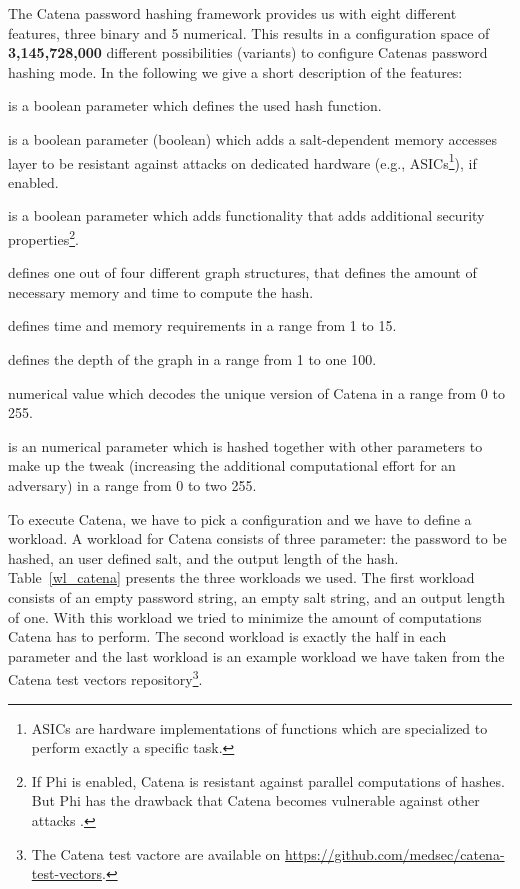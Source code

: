 The Catena password hashing framework provides us with eight different features, three binary and 5 numerical. This results in a configuration space of \textbf{3,145,728,000} different possibilities (variants) to configure Catenas password hashing mode. In the following we give a short description of the features:


\begin{description}[style=multiline,leftmargin=7em]
	\item [Hash] is a boolean parameter which defines the used hash function.
	\item [Gamma] is a boolean parameter (boolean) which adds a salt-dependent memory accesses layer to be resistant against attacks on dedicated hardware (e.g., ASICs\footnote{ASICs are hardware implementations of functions which are specialized to perform exactly a specific task.}), if enabled.
	\item [Phi] is a boolean parameter which adds functionality that adds additional security properties\footnote{If Phi is enabled, Catena is resistant against parallel computations of hashes. But Phi has the drawback that Catena becomes vulnerable against other attacks \cite{10.1007/978-3-319-29938-9_7}.}.
	\item [Graph] defines one out of four different graph structures, that defines the amount of necessary memory and time to compute the hash.
	\item [Garlic] defines time and memory requirements in a range from 1 to 15.
	\item [Lambda] defines the depth of the graph in a range from 1 to one 100.
	\item [VID] numerical value which decodes the unique version of Catena in a range from 0 to 255.
	\item [D] is an numerical parameter which is hashed together with other parameters to make up the tweak (increasing the additional computational effort for an adversary) in a range from 0 to two 255.
\end{description}

To execute Catena, we have to pick a configuration and we have to define a workload. A workload for Catena consists of three parameter: the password to be hashed, an user defined salt, and the output length of the hash. Table~\ref{wl_catena} presents the three workloads we used. The first workload consists of an empty password string, an empty salt string, and an output length of one. With this workload we tried to minimize the amount of computations Catena has to perform. The second workload is exactly the half in each parameter and the last workload is an example workload we have taken from the Catena test vectors repository\footnote{The Catena test vactore are available on \url{https://github.com/medsec/catena-test-vectors}.}.

